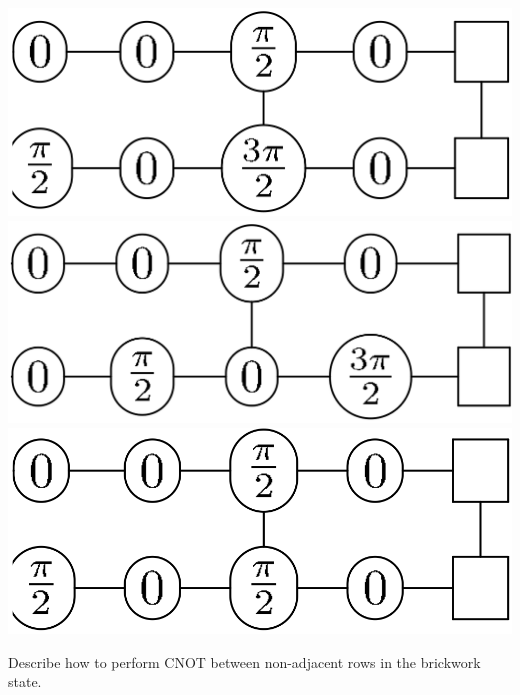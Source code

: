 \documentclass[a4paper,10pt,landscape,twocolumn]{scrartcl}
\begin{document}
\begin{exercise}
\begin{subex}
\begin{center}
			\includegraphics[]{10-practice-img9.png}\\\vspace{1em}
			\includegraphics[]{10-practice-img10.png}\qquad
			\includegraphics[]{10-practice-img11.png}
		\end{center}
	\end{subex}
	\begin{subex}
		Describe how to perform CNOT between non-adjacent rows in the brickwork state.
	\end{subex}
\end{exercise}
\end{document}

